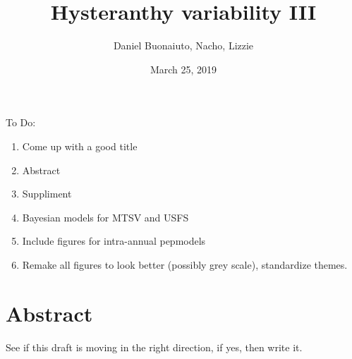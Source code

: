 \documentclass[12pt]{article}\usepackage[]{graphicx}\usepackage[]{color}
\title{Hysteranthy variability III}
\author{Daniel Buonaiuto, Nacho, Lizzie}
\date{March 25, 2019}
\begin{document}
\maketitle
To Do:
\begin{enumerate}
\item Come up with a good title
\item Abstract
\item Suppliment
\item Bayesian models for MTSV and USFS
\item Include figures for intra-annual pepmodels
\item Remake all figures to look better (possibly grey scale), standardize themes. 
\end{enumerate}
\section*{Abstract}
See if this draft is moving in the right direction, if yes, then write it.
\end{document}
